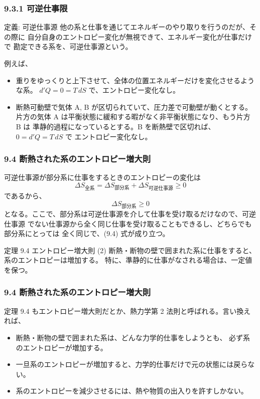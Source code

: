 \documentclass[aspectratio=149]{beamer}
\begin{document}
\begin{frame}
	\frametitle{9.3.1 可逆仕事限}
	\begin{block}{定義: 可逆仕事源}
		他の系と仕事を通じてエネルギーのやり取りを行うのだが、その際に
		自分自身のエントロピー変化が無視できて、エネルギー変化が仕事だけで
		勘定できる系を、可逆仕事源という。
	\end{block}
	例えば、
	\begin{itemize}
		\item 重りをゆっくりと上下させて、全体の位置エネルギーだけを変化させるような系。
			\(d'Q=0=T\,dS\) で、エントロピー変化なし。
		\item 断熱可動壁で気体 A, B が区切られていて、圧力差で可動壁が動くとする。
			片方の気体 A は平衡状態に緩和する暇がなく非平衡状態になり、もう片方 B は
			準静的過程になっているとする。B を断熱壁で区切れば、\(0=d'Q=T\,dS\) で
			エントロピー変化なし。
	\end{itemize}
\end{frame}

\begin{frame}
	\frametitle{9.4 断熱された系のエントロピー増大則}
	可逆仕事源が部分系に仕事をするときのエントロピーの変化は
	\[\Delta S_\text{全系}=\Delta S_\text{部分系}+\Delta S_\text{可逆仕事源}\geq0\]
	であるから、
	\[\Delta S_\text{部分系}\geq0\tag{9.4}\]
	となる。ここで、部分系は可逆仕事源を介して仕事を受け取るだけなので、可逆仕事源
	でない仕事源から全く同じ仕事を受け取ることもできるし、どちらでも部分系にとっては
	全く同じで、(9.4) 式が成り立つ。
	\begin{block}{定理 9.4 エントロピー増大則 (2)}
		断熱・断物の壁で囲まれた系に仕事をすると、系のエントロピーは増加する。
		特に、準静的に仕事がなされる場合は、一定値を保つ。
	\end{block}
\end{frame}

\begin{frame}
	\frametitle{9.4 断熱された系のエントロピー増大則}
	定理 9.4 もエントロピー増大則だとか、熱力学第 2 法則と呼ばれる。言い換えれば、
	\begin{itemize}
		\item 断熱・断物の壁で囲まれた系は、どんな力学的仕事をしようとも、
			必ず系のエントロピーが増加する。
		\item 一旦系のエントロピーが増加すると、力学的仕事だけで元の状態には戻らない。
		\item 系のエントロピーを減少させるには、熱や物質の出入りを許すしかない。
	\end{itemize}
\end{frame}
\end{document}
